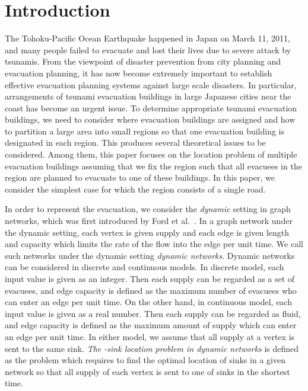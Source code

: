 \documentclass[a4paper]{llncs}
\begin{document}
\section{Introduction}
The Tohoku-Pacific Ocean Earthquake happened in Japan on March 11, 2011, 
and many people failed to evacuate and lost their lives due to severe attack by tsunamis. 
From the viewpoint of disaster prevention from city planning and evacuation planning,  
it has now become extremely important to establish effective evacuation planning systems against large scale disasters. In particular, 
arrangements of tsunami evacuation buildings in large Japanese cities near the coast has become an urgent issue. 
To determine appropriate tsunami evacuation buildings, we need to consider where evacuation buildings are assigned 
and how to partition a large area into small regions so that one evacuation building is designated in each region. 
This produces several theoretical issues to be considered. 
Among them, this paper focuses on the location problem of multiple evacuation buildings 
assuming that we fix the region such that all evacuees in the region are planned to evacuate to one of these buildings. 
In this paper, we consider the simplest case for which the region consists of a single road. 


In order to represent the evacuation, we consider the {\it dynamic} setting in graph networks, which was first introduced by Ford et al.~\cite{ff58}.
In a graph network under the dynamic setting, each vertex is given supply and each edge is given length and capacity which limits the rate of the flow into the edge per unit time.
We call such networks under the dynamic setting {\it dynamic networks}.
Dynamic networks can be considered in discrete and continuous models.
In discrete model, each input value is given as an integer.
Then each supply can be regarded as a set of evacuees, and edge capacity is defined as the maximum number of evacuees who can enter an edge per unit time.
On the other hand, in continuous model, each input value is given as a real number.
Then each supply can be regarded as fluid, and edge capacity is defined as the maximum amount of supply which can enter an edge per unit time.
In either model, we assume that all supply at a vertex is sent to the same sink.
{\it The -sink location problem in dynamic networks} is defined as the problem which requires to find the optimal location of  sinks in a given network 
so that all supply of each vertex is sent to one of  sinks in the shortest time.
\end{document}
